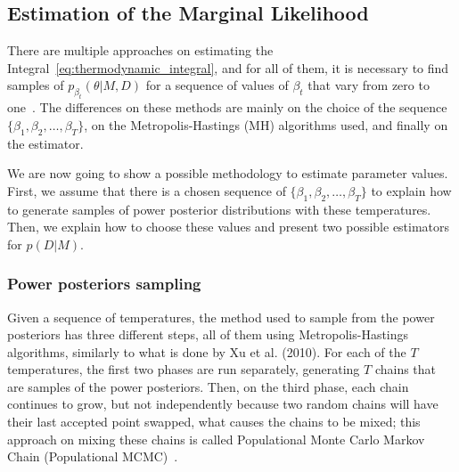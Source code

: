 \subsection{Estimation of the Marginal Likelihood}
There are multiple approaches on estimating the 
Integral~\ref{eq:thermodynamic_integral}, and for all of them, it is 
necessary to find samples of $p_{\beta_t} (\theta | M, D)$ for a 
sequence of values of $\beta_t$ that vary from zero to one~\cite{Xura20, 
Vyshemirsky2007, Friel2008}. The differences on these methods are mainly 
on the choice of the sequence $\{\beta_1, \beta_2, \ldots, \beta_T\}$,
on the Metropolis-Hastings (MH) algorithms used, and finally on the 
estimator.

We are now going to show a possible methodology to estimate parameter 
values. First, we assume that there is a chosen sequence of 
$\{\beta_1, \beta_2, \ldots, \beta_T\}$ to explain how to generate 
samples of power posterior distributions with these temperatures. Then, 
we explain how to choose these values and present two possible 
estimators for $p (D | M)$.

\subsubsection{Power posteriors sampling}
\label{sec:power_posteriors_sampling}
Given a sequence of temperatures, the method used to sample from the
power posteriors has three different steps, all of them using 
Metropolis-Hastings algorithms, similarly to what is done by Xu et al. 
(2010). For each of the $T$ temperatures, the first two phases are
run separately, generating $T$ chains that are samples of the power 
posteriors. Then, on the third phase, each chain continues to grow, but
not independently because two random chains will have their last accepted 
point swapped, what causes the chains to be mixed; this approach on 
mixing these chains is called Populational Monte Carlo Markov 
Chain (Populational MCMC)~\cite{Friel2008}.

